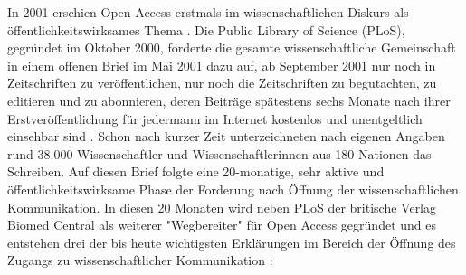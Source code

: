 In 2001 erschien Open Access erstmals im wissenschaftlichen Diskurs als öffentlichkeitswirksames Thema \cite{cite:19}. Die Public Library of Science (PLoS), gegründet im Oktober 2000, forderte die gesamte wissenschaftliche Gemeinschaft in einem offenen Brief im Mai 2001 dazu auf, ab September 2001 nur noch in Zeitschriften zu veröffentlichen, nur noch die Zeitschriften zu begutachten, zu editieren und zu abonnieren, deren Beiträge spätestens sechs Monate nach ihrer Erstveröffentlichung für jedermann im Internet kostenlos und unentgeltlich einsehbar sind \cite{cite:20}. Schon nach kurzer Zeit unterzeichneten nach eigenen Angaben \cite{cite:19a} rund 38.000 Wissenschaftler und Wissenschaftlerinnen aus 180 Nationen das Schreiben. Auf diesen Brief folgte eine 20-monatige, sehr aktive und öffentlichkeitswirksame Phase der Forderung nach Öffnung der wissenschaftlichen Kommunikation. In diesen 20 Monaten wird neben PLoS der britische Verlag Biomed Central als weiterer "Wegbereiter" für Open Access \cite[:8]{hofmann2015open} gegründet und es entstehen drei der bis heute wichtigsten Erklärungen im Bereich der Öffnung des Zugangs zu wissenschaftlicher Kommunikation \cite{CREATe_2014}:
